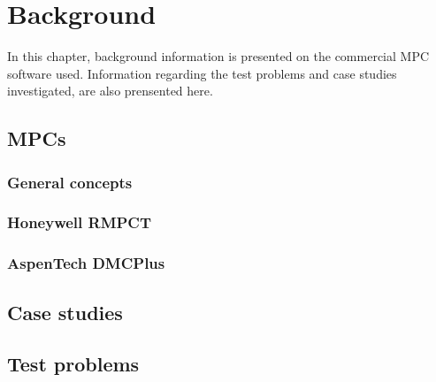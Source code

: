 \chapter{Background}\label{chap:background}
\begin{overview}
  In this chapter, background information is presented on the commercial
  MPC software used. Information regarding the test problems and case studies
  investigated, are also prensented here.
\end{overview}

\section{MPCs}
\subsection{General concepts}
\subsection{Honeywell RMPCT}
\subsection{AspenTech DMCPlus}

\section{Case studies}

\section{Test problems}